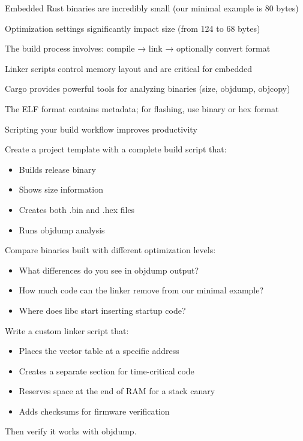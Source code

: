 \begin{keytakeaways}
    \item Embedded Rust binaries are incredibly small (our minimal example is 80 bytes)
    \item Optimization settings significantly impact size (from 124 to 68 bytes)
    \item The build process involves: compile → link → optionally convert format
    \item Linker scripts control memory layout and are critical for embedded
    \item Cargo provides powerful tools for analyzing binaries (size, objdump, objcopy)
    \item The ELF format contains metadata; for flashing, use binary or hex format
    \item Scripting your build workflow improves productivity
\end{keytakeaways}

\begin{exercise}[Easy]
    Create a project template with a complete build script that:
    \begin{itemize}
        \item Builds release binary
        \item Shows size information
        \item Creates both .bin and .hex files
        \item Runs objdump analysis
    \end{itemize}
\end{exercise}

\begin{exercise}[Medium]
    Compare binaries built with different optimization levels:
    \begin{itemize}
        \item What differences do you see in objdump output?
        \item How much code can the linker remove from our minimal example?
        \item Where does libc start inserting startup code?
    \end{itemize}
\end{exercise}

\begin{exercise}[Hard]
    Write a custom linker script that:
    \begin{itemize}
        \item Places the vector table at a specific address
        \item Creates a separate section for time-critical code
        \item Reserves space at the end of RAM for a stack canary
        \item Adds checksums for firmware verification
    \end{itemize}
    Then verify it works with objdump.
\end{exercise}

